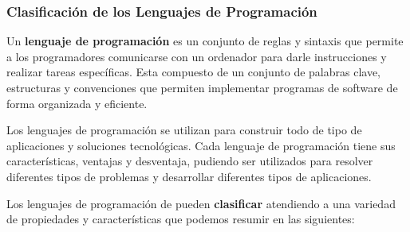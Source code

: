 \subsubsection{Clasificación de los Lenguajes de Programación}
Un \textbf{lenguaje de programación} es un conjunto de reglas y sintaxis que permite a los programadores comunicarse con un ordenador para darle instrucciones y realizar tareas específicas. Esta compuesto de un conjunto de palabras clave, estructuras y convenciones que permiten implementar programas de software de forma organizada y eficiente.

Los lenguajes de programación se utilizan para construir todo de tipo de aplicaciones y soluciones tecnológicas. Cada lenguaje de programación tiene sus características, ventajas y desventaja, pudiendo ser utilizados para resolver diferentes tipos de problemas y desarrollar diferentes tipos de aplicaciones.

Los lenguajes de programación de pueden \textbf{clasificar} atendiendo a una variedad de propiedades y características que podemos resumir en las siguientes:

